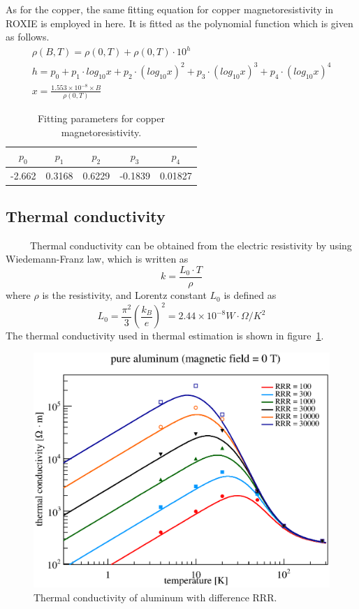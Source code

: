 As for the copper, the same fitting equation for copper magnetoresistivity in ROXIE is employed in here.
It is fitted as the polynomial function which is given as follows.
\begin{gather}
 \rho(B, T) = \rho(0, T) + \rho(0, T) \cdot 10^h \nonumber \\
 h = p_0 + p_1 \cdot log_{10}x + p_2 \cdot (log_{10}x)^2 + p_3 \cdot (log_{10}x)^3 + p_4 \cdot (log_{10}x)^4 \nonumber \\
 x = \frac{1.553\times 10^{-8} \times B}{\rho(0, T)} \nonumber 
\end{gather}
\begin{table}[H]
 \centering
 \begin{tabular}{ccccc} \hline \hline
  $p_0$ & $p_1$ & $p_2$ & $p_3$ & $p_4$ \\ \hline
  -2.662 & 0.3168 & 0.6229 & -0.1839 & 0.01827 \\ \hline \hline
 \end{tabular}
 \caption{Fitting parameters for copper magnetoresistivity.}
 \label{cumag}
\end{table}

\subsection{Thermal conductivity}
~~~~~Thermal conductivity can be obtained from the electric resistivity by using Wiedemann-Franz law, which is written as
\begin{equation}
 k = \frac{L_0 \cdot T}{\rho}
\end{equation}
where $\rho$ is the resistivity, and Lorentz constant $L_0$ is defined as
\begin{equation}
 L_0 = \frac{\pi^2}{3}(\frac{k_B}{e})^2 = 2.44\times 10^{-8} W\cdot\Omega /K^2
\end{equation}
The thermal conductivity used in thermal estimation is shown in figure~\ref{therm}.
\begin{figure}[H]
 \centering
 \includegraphics[scale=0.43]{chapter5/fig/thermalcon.eps}
 \caption{Thermal conductivity of aluminum with difference RRR.}
 \label{therm}
\end{figure}

